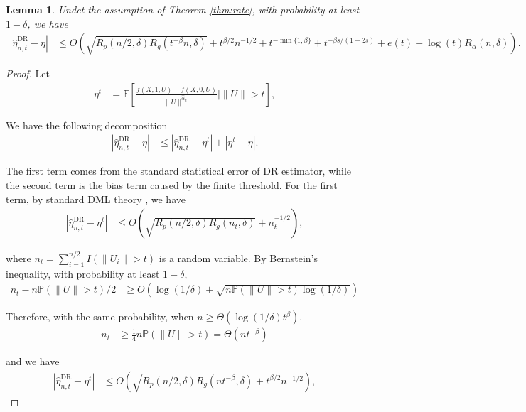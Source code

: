 \documentclass[12pt]{article}
\theoremstyle{plain}
\newtheorem{lemma}[theorem]{Lemma}
\theoremstyle{definition}
\newcommand{\tmop}[1]{\ensuremath{\operatorname{#1}}}
\begin{document}
\begin{lemma}
  \label{lemma:eta_rate}Undet the assumption of Theorem \ref{thm:rate}, with
  probability at least $1 - \delta$, we have
  \begin{align*}
    | \hat{\eta}_{n, t}^{\tmop{DR}} - \eta | & \leqslant O (\sqrt{R_p (n/2, \delta) R_g
    (t^{- \beta} n, \delta)} + t^{\beta / 2} n^{- 1 / 2} + t^{- \min \{1,
    \beta\}} + t^{- \beta s / (1 - 2 s)} + e (t) + \log (t) R_{\alpha} (n,\delta)) .
  \end{align*}
\end{lemma}
\begin{proof}
  Let
  \begin{align*}
    \eta^t & =\mathbb{E} \left[ \frac{f (X, 1, U) - f (X, 0,
    U)}{\|U\|^{\hat{\alpha}_{n}}} \mid \|U\|> t \right],
  \end{align*}
  
  We have the following decomposition
  \begin{align*}
    | \hat{\eta}_{n, t}^{\tmop{DR}} - \eta | & \leqslant | \hat{\eta}_{n,
    t}^{\tmop{DR}} - \eta^t | + | \eta^t - \eta |.
  \end{align*}
  
  The first term comes from the standard statistical error of DR estimator, while the second term is the bias term caused by the finite threshold. For the first term, by standard DML theory {\citep{foster2023orthogonal}},
  we have
  \begin{align*}
    | \hat{\eta}_{n, t}^{\tmop{DR}} - \eta^t | & \leqslant O \left( \sqrt{R_p
    (n/2, \delta) R_g (n_t, \delta)} + n_t^{- 1 / 2} \right),
  \end{align*}
  
  where $n_t = \sum_{i = 1}^{n/2} I (\|U_i \|> t)$ is a random variable. By
  Bernstein's inequality, with probability at least $1 - \delta$,
  \begin{align*}
    n_t - n\mathbb{P}(\|U\|> t)/2 & \geqslant O \left( \log (1 / \delta) +
    \sqrt{n\mathbb{P}(\|U\|> t) \log (1 / \delta)} \right)
  \end{align*}
  
  Therefore, with the same probability, when $n \geqslant \Theta (\log (1 /
  \delta) t^{\beta})$.
  \begin{align*}
    n_t & \geqslant \frac{1}{4} n\mathbb{P}(\|U\|> t) = \Theta (nt^{- \beta})
  \end{align*}
  
  and we have
  \begin{align}
    | \hat{\eta}_{n, t}^{\tmop{DR}} - \eta^t | & \leqslant O \left( \sqrt{R_p
    (n/2, \delta) R_g (nt^{- \beta}, \delta)} + t^{\beta / 2} n^{- 1 / 2}
    \right),  \label{eq:eta_est}
  \end{align}
  

\end{proof}
\end{document}
